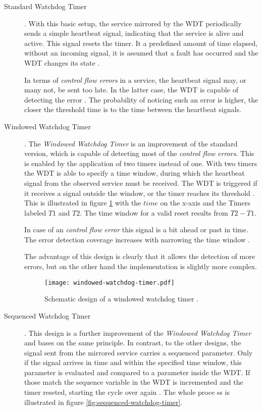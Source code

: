 \begin{description}
\item [Standard Watchdog Timer] .
With this basic setup, the service mirrored by the WDT periodically sends a simple heartbeat signal, indicating that the service is alive and active. This signal resets the timer. It a predefined amount of time elapsed, without an incoming signal, it is assumed that a fault has occurred and the WDT changes its state \cite{elattar2007}.

In terms of \emph{control flow errors} in a service, the heartbeat signal may, or many not, be sent too late. In the latter case, the WDT is capable of detecting the error \cite{elattar2007}. 
The probability of noticing such an error is higher, the closer the threshold time is to the time between the heartbeat signals.

\item [Windowed Watchdog Timer] .
The \emph{Windowed Watchdog Timer} is an improvement of the standard version, which is capable of detecting most of the \emph{control flow errors}. This is enabled by the application of two timers instead of one. With two timers the WDT is able to specify a time window, during which the heartbeat signal from the observed service must be received. The WDT is triggered if it receives a signal outside the window, or the timer reaches its threshold \cite{elattar2007}. This is illustrated in figure \ref{fig:windowed-watchdog-timer} with the $time$ on the x-axis and the Timers labeled $T1$ and $T2$. The time window for a valid reset results from $T2 - T1$.

In case of an \emph{control flow error} this signal is a bit ahead or past in time. The error detection coverage increases with narrowing the time window \cite{elattar2007}.  

The advantage of this design is clearly that it allows the detection of more errors, but on the other hand the implementation is slightly more complex.

\begin{figure}[!htbp]
\centering
\texttt{[image: windowed-watchdog-timer.pdf]}
\caption{Schematic design of a windowed watchdog timer \cite{elattar2007}.}
\label{fig:windowed-watchdog-timer}
\end{figure}

\item [Sequenced Watchdog Timer] . 
This design is a further improvement of the \emph{Windowed Watchdog Timer} and bases on the same principle. In contrast, to the other designs, the signal sent from the mirrored service carries a sequenced parameter. Only if the signal arrives in time and within the specified time window, this parameter is evaluated and compared to a parameter inside the WDT. If those match the sequence variable in the WDT is incremented and the timer reseted, starting the cycle over again \cite{elattar2007}.
The whole proce ss is illustrated in figure \ref{fig:sequenced-watchdog-timer}.


\end{description}
